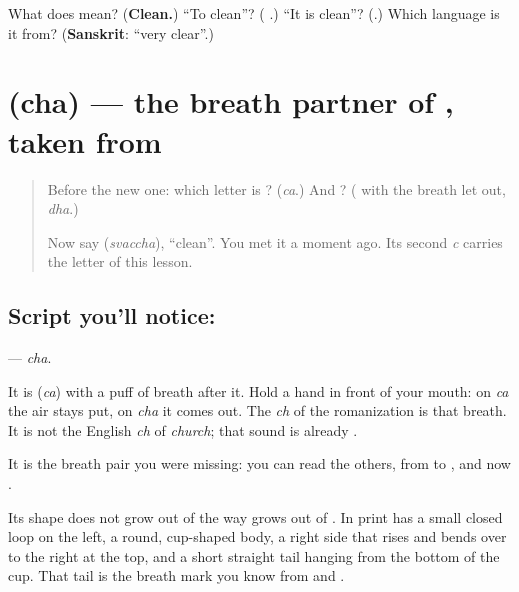 \begin{tcolorbox}[breakable,colback=teal!4,colframe=teal!35!black,title={Before you move on}]
What does \textbf{} mean? (\textbf{Clean.}) \textquotedblleft{}To clean\textquotedblright{}? (\textbf{ }.) \textquotedblleft{}It is clean\textquotedblright{}? (\textbf{}.) Which language is it from? (\textbf{Sanskrit}: \textquotedblleft{}very clear\textquotedblright{}.)
\end{tcolorbox}
\section[\texorpdfstring{\kn{ಛ} (cha)}{ಛ (cha)}]{ (cha) — the breath partner of , taken from }

\label{lesson:KA-S174-letter-chha}



\begin{quote}
Before the new one: which letter is \textbf{}? (\emph{ca}.) And \textbf{}? (\textbf{} with the breath let out, \emph{dha}.)

Now say \textbf{} (\emph{svaccha}), \textquotedblleft{}clean\textquotedblright{}. You met it a moment ago. Its second \emph{c} carries the letter of this lesson.
\end{quote}

\subsection*{Script you'll notice: }
\textbf{} — \emph{cha}.

It is \textbf{} (\emph{ca}) with a puff of breath after it. Hold a hand in front of your mouth: on \emph{ca} the air stays put, on \emph{cha} it comes out. The \emph{ch} of the romanization is that breath. It is not the English \emph{ch} of \emph{church}; that sound is already \textbf{}.

It is the breath pair you were missing: you can read the others, from \textbf{ } to \textbf{ }, and now \textbf{ }.

Its shape does not grow out of \textbf{} the way \textbf{} grows out of \textbf{}. In print \textbf{} has a small closed loop on the left, a round, cup-shaped body, a right side that rises and bends over to the right at the top, and a short straight tail hanging from the bottom of the cup. That tail is the breath mark you know from \textbf{} and \textbf{}.

